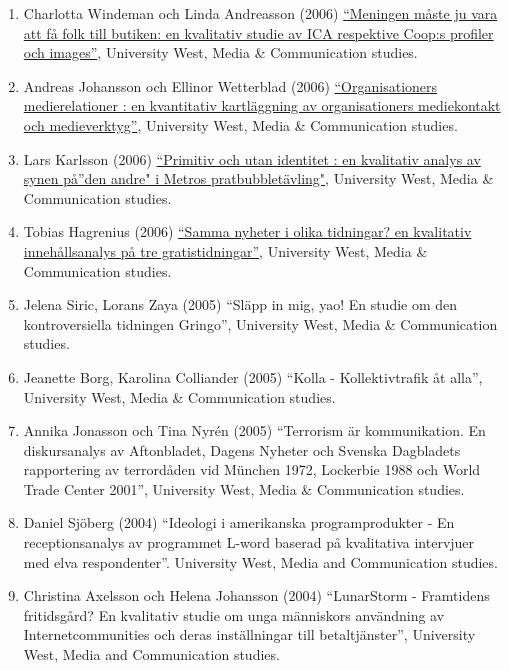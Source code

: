 \documentclass[
]{article}
\providecommand{\tightlist}{%
  \setlength{\itemsep}{0pt}\setlength{\parskip}{0pt}}
\begin{document}
\begin{enumerate}
\def\labelenumi{\arabic{enumi}.}
\tightlist
\item
  Charlotta Windeman och Linda Andreasson (2006)
  \href{http://urn.kb.se/resolve?urn=urn:nbn:se:hv:diva-846}{``Meningen
  måste ju vara att få folk till butiken: en kvalitativ studie av ICA
  respektive Coop:s profiler och images''}, University West, Media \&
  Communication studies.
\item
  Andreas Johansson och Ellinor Wetterblad (2006)
  \href{http://urn.kb.se/resolve?urn=urn:nbn:se:hv:diva-846}{``Organisationers
  medierelationer : en kvantitativ kartläggning av organisationers
  mediekontakt och medieverktyg''}, University West, Media \&
  Communication studies.
\item
  Lars Karlsson (2006)
  \href{http://www.uppsatser.se/uppsats/7e12f0e57f/}{``Primitiv och utan
  identitet : en kvalitativ analys av synen på''den andre" i Metros
  pratbubbletävling"}, University West, Media \& Communication studies.
\item
  Tobias Hagrenius (2006)
  \href{http://urn.kb.se/resolve?urn=urn:nbn:se:hv:diva-851}{``Samma
  nyheter i olika tidningar? en kvalitativ innehållsanalys på tre
  gratistidningar''}, University West, Media \& Communication studies.
\item
  Jelena Siric, Lorans Zaya (2005) ``Släpp in mig, yao! En studie om den
  kontroversiella tidningen Gringo'', University West, Media \&
  Communication studies.
\item
  Jeanette Borg, Karolina Colliander (2005) ``Kolla - Kollektivtrafik åt
  alla'', University West, Media \& Communication studies.
\item
  Annika Jonasson och Tina Nyrén (2005) ``Terrorism är kommunikation. En
  diskursanalys av Aftonbladet, Dagens Nyheter och Svenska Dagbladets
  rapportering av terrordåden vid München 1972, Lockerbie 1988 och World
  Trade Center 2001'', University West, Media \& Communication studies.
\item
  Daniel Sjöberg (2004) ``Ideologi i amerikanska programprodukter - En
  receptionsanalys av programmet L-word baserad på kvalitativa
  intervjuer med elva respondenter''. University West, Media and
  Communication studies.
\item
  Christina Axelsson och Helena Johansson (2004) ``LunarStorm -
  Framtidens fritidsgård? En kvalitativ studie om unga människors
  användning av Internetcommunities och deras inställningar till
  betaltjänster'', University West, Media and Communication studies.
\end{enumerate}
\end{document}

